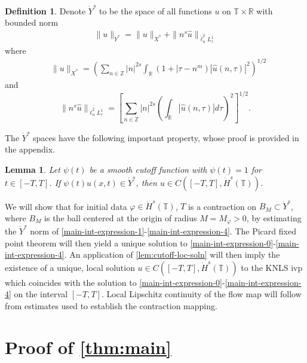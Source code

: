 \documentclass[12pt,reqno]{amsart}
\numberwithin{equation}{section}  %
\numberwithin{figure}{section}
\newcommand{\rr}{\mathbb{R}}
\newcommand{\zz}{\mathbb{Z}}
\newcommand{\ci}{\mathbb{T}}
\newcommand{\zzdot}{\dot{\zz}}
\newcommand{\wh}{\widehat}
\newcommand{\vp}{\varphi}
\theoremstyle{plain}
\newtheorem{lemma}{Lemma}
\theoremstyle{definition}
\newtheorem{definition}{Definition}
\theoremstyle{remark}
\begin{document}
\begin{definition}
	Denote $\dot{Y}^s$ to be the space of all
	functions $u$ on $\ci \times \rr$ with
	bounded norm
\begin{equation}
	\label{Y-s-norm}
	\begin{split}
		\|u\|_{\dot{Y}^s} = \|u\|_{\dot{X}^s} + \|n^s \wh{ u}\|_{ \dot{\ell}^2_n L^1_\tau }
	\end{split}
\end{equation}
%
%
%
%
where
%
\begin{equation}
	\label{X^s-norm}
	\begin{split}
		& \|u\|_{\dot{X}^s}
		= \left ( \sum_{n\in \zz} |n|^{2s} \int_\rr \left ( 1 + | 
		\tau - n^{m } \right ) | \wh{u} ( n, \tau ) |^2
		\right )^{1/2}
	\end{split}
\end{equation}
and
%
%
\begin{equation}
	\label{E-norm}
	\|n^s \wh{u}\|_{ \dot{\ell}^2_n L^1_\tau } = \left[ \sum_{n \in \zzdot}| n |^{2s} \left(
	\int_{\rr}| \wh{u}(n, \tau) |d \tau \right)^{2} \right]^{1/2}.
\end{equation}
%
%
%
%
\end{definition}
The $\dot{Y}^s$ spaces have the following important property, whose proof
is provided in the appendix.
\begin{lemma}
	\label{lem:cutoff-loc-soln}
	Let $\psi(t)$ be a smooth cutoff function with $\psi(t) =1$ for $t \in [-T, T]$. If
	$\psi(t)u(x,t) \in \dot{Y}^s$, then $u \in C([-T, T], \dot{H}^s(\ci))$.
\end{lemma}
%
%
We will 
show that for initial data $\vp \in \dot{H}^s(\ci)$, $T$ is a contraction on $B_M 
\subset \dot{Y}^s$, where $B_M$ is the ball centered at the origin of radius $M = 
M_{\vp}> 0$, by estimating the $\dot{Y}^s$
norm of \eqref{main-int-expression-1}-\eqref{main-int-expression-4}. The 
Picard fixed point theorem will
then yield a unique solution to
\eqref{main-int-expression-0}-\eqref{main-int-expression-4}. An application of
\autoref{lem:cutoff-loc-soln} will then imply the existence of a unique, local
solution $u \in C([-T, T], \dot{H}^s(\ci))$ to the KNLS ivp which coincides with the solution to
\eqref{main-int-expression-0}-\eqref{main-int-expression-4} on the interval $[-T, T]$. Local Lipschitz continuity of the flow map will follow
from estimates used to establish the contraction mapping. %
%
%
%
%
%
%
%
\section{Proof of \autoref{thm:main}}
%
%
%
%
%
%
%
%
%
%
%
\end{document}
